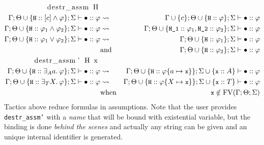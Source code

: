 \documentclass[english, mgr]{iithesis}
\renewcommand{\tt}[1]{\texttt{\small{#1}}}
\renewcommand{\it}[1]{\textit{#1}}
\begin{document}
\begin{eqnarray*}
  \text{\lstinline[columns=fixed]{destr_assm H} }& & \\
  \jgmnt[\Gamma; \Theta \cup \{\tt{H}\ofkind \fCAnd{\constr}{\formphi} \}; \Sigma]{\hole\ofkind{\formphi}} & \leadsto & \jgmnt[{\Gamma \cup \{\constr\}}; \Theta \cup {\{ \tt{H} \ofkind \formphi\}}; \Sigma]{\hole\ofkind{\formphi}} \\
  \jgmnt[\Gamma; \Theta \cup \{\tt{H}\ofkind \formphi_1 \wedge \formphi_2 \}; \Sigma]{\hole\ofkind{\formphi}} & \leadsto & \jgmnt[{\Gamma; \Theta \cup {\{ \tt{H\_1}\ofkind \formphi_1, \tt{H\_2}\ofkind \formphi_2\}}; \Sigma}]{\hole\ofkind{\formphi}} \\
  \jgmnt[\Gamma; \Theta \cup \{\tt{H}\ofkind \formphi_1 \vee \formphi_2 \}; \Sigma]{\hole\ofkind{\formphi}} & \leadsto & \jgmnt[\Gamma; \Theta  \cup \{\tt{H}\ofkind \formphi_1\}; \Sigma]{\hole\ofkind{\formphi}} \\
  & \text{and} & \jgmnt[\Gamma; \Theta  \cup \{\tt{H}\ofkind \formphi_2\}; \Sigma]{\hole\ofkind{\formphi}} \\
  \text{\lstinline[columns=fixed]{destr_assm' H x} }& &
  \\
  \jgmnt[\Gamma; \Theta \cup \{\tt{H}\ofkind\fExistsAtom{\atomv}{\formphi} \}; \Sigma]{\hole\ofkind{\formphi}} & \leadsto & \jgmnt[\Gamma ; \Theta \cup {\{\tt{H}\ofkind\formphi\subst{\atomv}{\tt{x}}\}}; \Sigma\cup {\{\tt{x} \ofkind {A}\}}]{\hole\ofkind{\formphi}} \\
  \jgmnt[\Gamma; \Theta \cup \{\tt{H}\ofkind\fExistsTerm{\termv}{\formphi} \}; \Sigma]{\hole\ofkind{\formphi}} & \leadsto & \jgmnt[\Gamma ; \Theta \cup {\{\tt{H}\ofkind\formphi\subst{\termv}{\tt{x}}\}}; \Sigma\cup {\{\tt{x} \ofkind {T}\}}]{\hole\ofkind{\formphi}} \\
   & \text{when} & \tt{x} \notin \fv[\Gamma; \Theta; \Sigma]
  \end{eqnarray*}
Tactics above reduce formulas in assumptions.
Note that the user provides \tt{destr\_assm'} with a \it{name} that will be bound
with existential variable, but the binding is done \it{behind the scenes} and
actually any string can be given and an unique internal identifier is generated.
\end{document}
